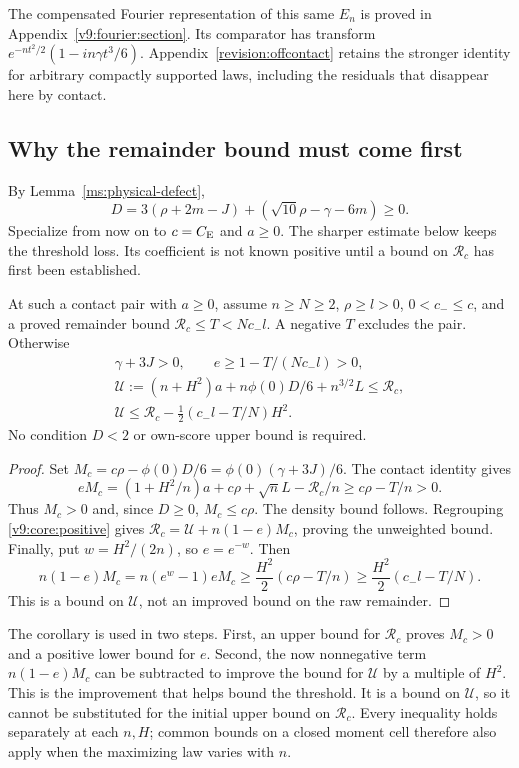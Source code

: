 The compensated Fourier representation of this same $E_n$ is proved in
Appendix~\ref{v9:fourier:section}. Its comparator has transform
$e^{-nt^2/2}(1-in\gamma t^3/6)$. Appendix~\ref{revision:offcontact}
retains the stronger identity for arbitrary compactly supported laws,
including the residuals that disappear here by contact.

\subsection{Why the remainder bound must come first}
By Lemma~\ref{ms:physical-defect},
\begin{equation}\label{v9:core:defect}
 D=3(\rho+2m-J)+(\sqrt{10}\rho-\gamma-6m)\ge0.
\end{equation}
Specialize from now on to $c=C_{\mathrm E}$ and $a\ge0$. The sharper estimate
below keeps the threshold loss. Its coefficient is not known positive
until a bound on $\mathcal R_c$ has first been established.

\begin{corollary}\label{v9:core:license}\label{v9:core:phase-price}
At such a contact pair with $a\ge0$, assume $n\ge N\ge2$,
$\rho\ge l>0$, $0<c_-\le c$, and a proved remainder bound
$\mathcal R_c\le T<Nc_-l$. A negative $T$ excludes the pair.
Otherwise
\begin{gather*}
 \gamma+3J>0,\qquad e\ge1-T/(Nc_-l)>0,\\
 \mathcal U:=(n+H^2)a+n\phi(0)D/6+n^{3/2}L
       \le\mathcal R_c,\\
 \mathcal U\le\mathcal R_c-\tfrac12(c_-l-T/N)H^2.
\end{gather*}
No condition $D<2$ or own-score upper bound is required.
\end{corollary}
\begin{proof}
Set $M_c=c\rho-\phi(0)D/6=\phi(0)(\gamma+3J)/6$.
The contact identity gives
\[
 eM_c=(1+H^2/n)a+c\rho+\sqrt n L-\mathcal R_c/n
        \ge c\rho-T/n>0.
\]
Thus $M_c>0$ and, since $D\ge0$, $M_c\le c\rho$.
The density bound follows. Regrouping \eqref{v9:core:positive} gives
$\mathcal R_c=\mathcal U+n(1-e)M_c$, proving the unweighted bound.
Finally, put $w=H^2/(2n)$, so $e=e^{-w}$. Then
\[
 n(1-e)M_c=n(e^w-1)eM_c
 \ge\frac{H^2}{2}(c\rho-T/n)
 \ge\frac{H^2}{2}(c_-l-T/N).
\]
This is a bound on $\mathcal U$, not an
improved bound on the raw remainder.
\end{proof}

The corollary is used in two steps. First, an upper bound for
$\mathcal R_c$ proves $M_c>0$ and a positive lower bound for $e$.
Second, the now nonnegative term $n(1-e)M_c$ can be subtracted to
improve the bound for $\mathcal U$ by a multiple of $H^2$. This is the
improvement that helps bound the threshold. It is a bound on
$\mathcal U$, so it cannot be substituted for the initial upper bound
on $\mathcal R_c$. Every inequality holds separately at each $n,H$;
common bounds on a closed moment cell therefore also apply when the
maximizing law varies with $n$.
